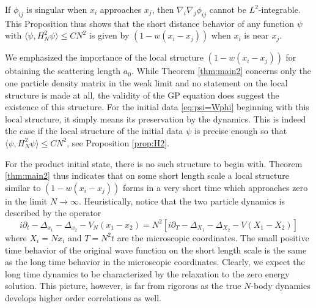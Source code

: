 \documentclass[11pt]{article}
\begin{document}
If $\phi_{ij}$ is singular when $x_i$ approaches $x_j$, then
$\nabla_i \nabla_j  \phi_{ij}$ cannot be $L^2$-integrable. This
Proposition thus shows that  the short distance behavior of any
function $\psi$ with $\langle \psi, H_N^2 \psi \rangle \le C N^{2}$
is given by $(1-w(x_i -x_j))$  when $x_{i}$ is near $x_{j}$.

\medskip

We emphasized the importance of the local structure $(1-w(x_i
-x_j))$ for obtaining the scattering length $a_0$. While Theorem
\ref{thm:main2} concerns only the one particle density matrix in the
weak limit and no statement on the local structure is made at all,
the validity of the GP equation does suggest the existence of this
structure. For the initial data \eqref{eq:psi=Wphi} beginning with
this local structure, it simply means its preservation by the
dynamics. This is indeed the case if the local structure of the
initial data $\psi$ is precise enough so that $\langle \psi, H_N^2
\psi \rangle \le C N^2$, see Proposition \ref{prop:H2}.

For the product initial state, there is no such structure to begin
with. Theorem \ref{thm:main2} thus indicates  that on some short
length scale a local structure similar to $(1-w(x_i -x_j))$ forms in
a very short time which approaches zero in the limit $N\to \infty$.
Heuristically, notice that the two particle dynamics is described by
the operator
$$
i\partial_t -\Delta_{x_1}-\Delta_{x_2}
- V_N(x_1-x_2) = N^2 \left [ i\partial_T
-\Delta_{X_1}-\Delta_{X_2}- V(X_1-X_2) \right ]
$$
where $X_i = Nx_i$ and $T= N^2 t$ are the microscopic coordinates.
The small positive time behavior of the original wave function on
the short length scale is the same as the long time behavior
in the microscopic coordinates. Clearly, we expect the long time
dynamics to be characterized by the relaxation to the zero energy
solution. This picture, however, is far from rigorous as the true
$N$-body dynamics develops higher order correlations as well.
\end{document}
